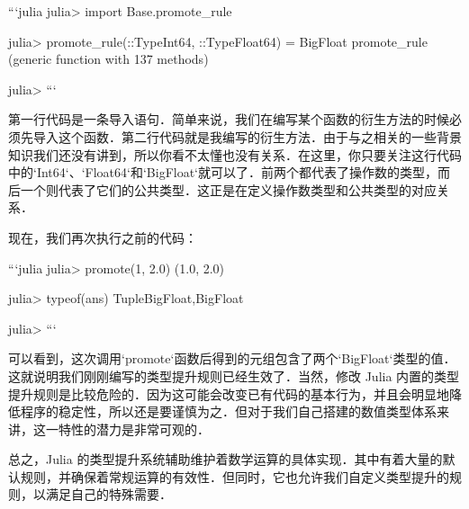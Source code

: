 ```julia
julia> import Base.promote_rule

julia> promote_rule(::Type{Int64}, ::Type{Float64}) = BigFloat
promote_rule (generic function with 137 methods)

julia>
```

第一行代码是一条导入语句．简单来说，我们在编写某个函数的衍生方法的时候必须先导入这个函数．第二行代码就是我编写的衍生方法．由于与之相关的一些背景知识我们还没有讲到，所以你看不太懂也没有关系．在这里，你只要关注这行代码中的`Int64`、`Float64`和`BigFloat`就可以了．前两个都代表了操作数的类型，而后一个则代表了它们的公共类型．这正是在定义操作数类型和公共类型的对应关系．

现在，我们再次执行之前的代码：

```julia
julia> promote(1, 2.0)
(1.0, 2.0)

julia> typeof(ans)
Tuple{BigFloat,BigFloat}

julia> 
```

可以看到，这次调用`promote`函数后得到的元组包含了两个`BigFloat`类型的值．这就说明我们刚刚编写的类型提升规则已经生效了．当然，修改 Julia 内置的类型提升规则是比较危险的．因为这可能会改变已有代码的基本行为，并且会明显地降低程序的稳定性，所以还是要谨慎为之．但对于我们自己搭建的数值类型体系来讲，这一特性的潜力是非常可观的．

总之，Julia 的类型提升系统辅助维护着数学运算的具体实现．其中有着大量的默认规则，并确保着常规运算的有效性．但同时，它也允许我们自定义类型提升的规则，以满足自己的特殊需要．